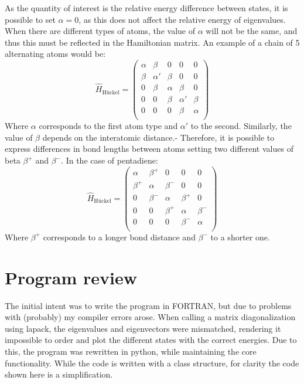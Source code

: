 \documentclass[twocolumn]{article}
\begin{document}
As the quantity of interest is the relative energy difference between states, it is possible to set $\alpha=0$, as this does not affect the relative energy of eigenvalues. When there are different types of atoms, the value of $\alpha$ will not be the same, and thus this must be reflected in the Hamiltonian matrix. An example of a chain of 5 alternating atoms would be:
\begin{equation}
    \hat{H}_{\textrm{Hückel}}  =
    \begin{pmatrix}
        \alpha & \beta & 0 & 0 & 0 \\
        \beta & \alpha'  & \beta & 0 & 0 \\
        0 & \beta & \alpha & \beta & 0 \\
        0 & 0 & \beta & \alpha'  & \beta \\
        0 & 0 & 0 & \beta & \alpha \\
    \end{pmatrix}
\end{equation}
Where $\alpha$ corresponds to the first atom type and $\alpha'$ to the second. Similarly, the value of $\beta$ depends on the interatomic distance.- Therefore, it is possible to express differences in bond lengths between atoms setting two different values of beta $\beta^+$ and $\beta^-$. In the case of pentadiene: 
\begin{equation}
    \hat{H}_{\textrm{Hückel}}  =
    \begin{pmatrix}
        \alpha & \beta^+ & 0 & 0 & 0 \\
        \beta^+ & \alpha & \beta^- & 0 & 0 \\
        0 & \beta^- & \alpha & \beta^+ & 0 \\
        0 & 0 & \beta^+ & \alpha & \beta^- \\
        0 & 0 & 0 & \beta^- & \alpha \\
    \end{pmatrix}
\end{equation}
Where  $\beta^+$ corresponds to a longer bond distance and $\beta^-$ to a shorter one. 

\section{Program review}
The initial intent was to write the program in FORTRAN, but due to problems with (probably) my compiler errors arose. When calling a matrix diagonalization using  lapack, the eigenvalues and eigenvectors were mismatched, rendering it impossible to order and plot the different states with the correct energies. Due to this, the program was rewritten in python, while maintaining the core functionality. While the code is written with a class structure, for clarity the code shown here is a simplification. 
\end{document}
